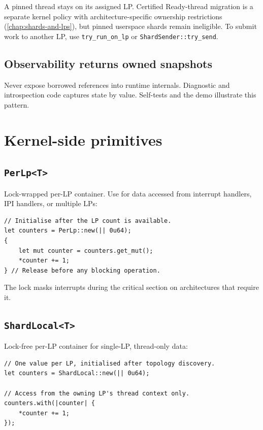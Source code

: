 A pinned thread stays on its assigned LP. Certified Ready-thread migration is
a separate kernel policy with architecture-specific ownership restrictions
(\autoref{chap:shards-and-lps}), but pinned userspace shards remain ineligible.
To submit work to another LP, use
\texttt{try\_run\_on\_lp} or \texttt{ShardSender::try\_send}.

\subsection{Observability returns owned snapshots}

Never expose borrowed references into runtime internals. Diagnostic and
introspection code captures state by value. Self-tests and the demo illustrate
this pattern.

\section{Kernel-side primitives}

\subsection{\texttt{PerLp<T>}}

Lock-wrapped per-LP container. Use for data accessed from interrupt handlers,
IPI handlers, or multiple LPs:

\begin{lstlisting}[style=rustCode]
// Initialise after the LP count is available.
let counters = PerLp::new(|| 0u64);
{
    let mut counter = counters.get_mut();
    *counter += 1;
} // Release before any blocking operation.
\end{lstlisting}

The lock masks interrupts during the critical section on architectures that
require it.

\subsection{\texttt{ShardLocal<T>}}

Lock-free per-LP container for single-LP, thread-only data:

\begin{lstlisting}[style=rustCode]
// One value per LP, initialised after topology discovery.
let counters = ShardLocal::new(|| 0u64);

// Access from the owning LP's thread context only.
counters.with(|counter| {
    *counter += 1;
});
\end{lstlisting}

